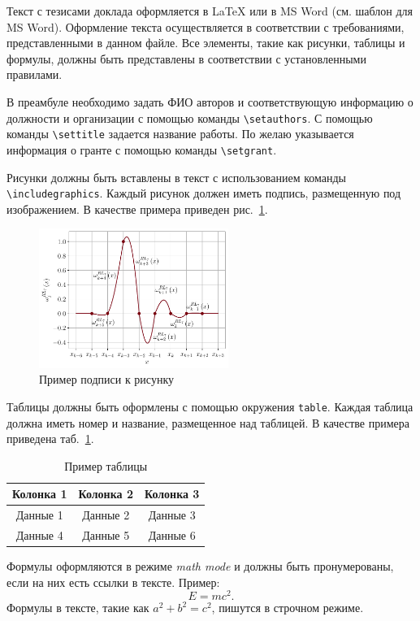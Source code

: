 \documentclass[12pt]{article}
\begin{document}
   
	Текст с тезисами доклада оформляется в \LaTeX{} или в MS Word (см. шаблон для MS Word). Оформление текста осуществляется в соответствии с требованиями, представленными в данном файле. Все элементы, такие как рисунки, таблицы и формулы, должны быть представлены в соответствии с установленными правилами.
	
	В преамбуле необходимо задать ФИО авторов и соответствующую информацию о должности и организации с помощью команды \verb|\setauthors|. С помощью команды \verb|\settitle| задается название работы.
	По желаю указывается информация о гранте с помощью команды \verb|\setgrant|.
	
	Рисунки должны быть вставлены в текст с использованием команды \verb|\includegraphics|. Каждый рисунок должен иметь подпись, размещенную под изображением. В качестве примера приведен рис.~\ref{fig:example}.
	\begin{figure}[h!]
		\centering
		\includegraphics[width=0.55\textwidth]{figures/example.pdf} %
		\caption{Пример подписи к рисунку}
		\label{fig:example}
	\end{figure}
	
	Таблицы должны быть оформлены с помощью окружения \verb|table|. Каждая таблица должна иметь номер и название, размещенное над таблицей. В качестве примера приведена таб.~\ref{tab:example}.
	\begin{table}[h!]
		\centering
		\caption{Пример таблицы}
		\label{tab:example}
		\begin{tabular}{|c|c|c|}
			\hline
			Колонка 1 & Колонка 2 & Колонка 3 \\ \hline
			Данные 1  & Данные 2  & Данные 3  \\ \hline
			Данные 4  & Данные 5  & Данные 6  \\ \hline
		\end{tabular}
	\end{table}
	
	Формулы оформляются в режиме \textit{math mode} и должны быть пронумерованы, если на них есть ссылки в тексте. Пример:
	\begin{equation}
		E = mc^2.
		\label{eq:energy}
	\end{equation}
	Формулы в тексте, такие как $a^2 + b^2 = c^2$, пишутся в строчном режиме.
	
\end{document}
